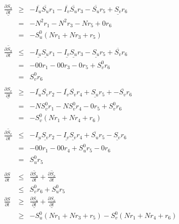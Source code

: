 \begin{eqnarray*}
    \underline{\frac{\partial S_u}{\partial t}} &\geq&  - \overline{I_u} \overline{S_u} r_1 - \overline{I_v} \overline{S_u} r_3 - \overline{S_u} r_5 + \underline{S_v} r_6\\
    &=&  - N^2 r_1 - N^2 r_3 - N r_5 + 0 r_6\\
    &=&  - S_u^0 (N  r_1 + N r_3 + r_5)\\
    \\
    \overline{\frac{\partial S_u}{\partial t}} &\leq&  - \underline{I_u} \underline{S_u} r_1 - \underline{I_v} \underline{S_u} r_3 - \underline{S_u} r_5 + \overline{S_v} r_6\\
    &=&   - 0 0 r_1 - 0 0 r_3 - 0 r_5 + S_v^0 r_6\\
    &=&  S_v^0 r_6\\
    \\
    \underline{\frac{\partial S_v}{\partial t}} &\geq&  - \overline{I_u} \overline{S_v} r_2 - \overline{I_v} \overline{S_v} r_4 + \underline{S_u} r_5 +-\overline{S_v} r_6\\
    &=&  - N S_v^0 r_1 - N S_v^0 r_4 - 0 r_5 + S_v^0 r_6\\
    &=&  - S_v^0 (N  r_1 + N r_4 + r_6)\\
    \\
    \overline{\frac{\partial S_v}{\partial t}} &\leq&  - \underline{I_u} \underline{S_v} r_2 - \underline{I_v} \underline{S_v} r_4 + \overline{S_u} r_5 -\underline{S_v} r_6\\
    &=&  - 0 0 r_1 -0 0 r_4 + S_u^0 r_5 - 0 r_6\\
    &=&  S_u^0 r_5\\
    \\
    \frac{\partial S}{\partial t} &\leq& \overline{\frac{\partial S_u}{\partial t}}  + \overline{\frac{\partial S_v}{\partial t}}\\
    &\leq& S_v^0 r_6 + S_u^0 r_5\\
    \frac{\partial S}{\partial t} &\geq& \underline{\frac{\partial S_u}{\partial t}}  + \underline{\frac{\partial S_v}{\partial t}}\\
    &\geq& - S_u^0 (N  r_1 + N r_3 + r_5) - S_v^0 (N  r_1 + N r_4 + r_6)
    \\
\end{eqnarray*}

